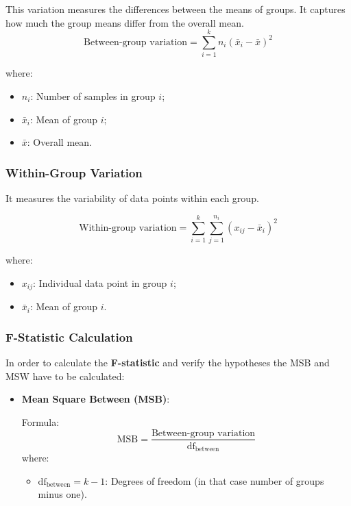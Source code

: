 This variation measures the differences between the means of groups. It
captures how much the group means differ from the overall mean.
\[
\text{Between-group \  variation} = \sum_{i=1}^{k} n_i (\bar{x}_i - \bar{x})^2
\]

\noindent \noindent where:
\begin{itemize}
    \item \(n_i\): Number of samples in group \(i\);
    \item \(\bar{x}_i\): Mean of group \(i\);
    \item \(\bar{x}\): Overall mean.
\end{itemize}


\subsubsection*{Within-Group Variation}
It measures the variability of data points within each group.

\[
\text{Within-group  \ variation} = \sum_{i=1}^{k} \sum_{j=1}^{n_i} (x_{ij} - \bar{x}_i)^2
\]

\noindent \noindent where:
\begin{itemize}
    \item \(x_{ij}\): Individual data point in group \(i\);
    \item \(\bar{x}_i\): Mean of group \(i\).
\end{itemize}



\subsubsection*{F-Statistic Calculation}
In order to calculate the \textbf{F-statistic} and verify the hypotheses
the MSB and MSW have to be calculated:

\begin{itemize}
    \item \textbf{Mean Square Between (MSB)}:
    
    Formula:
    \[
    \text{MSB} = \frac{\text{Between-group variation}}{\text{df}_{\text{between}}}
    \]
    \noindent \noindent where:
    \begin{itemize}
        \item \( \text{df}_{\text{between}} = k - 1 \): Degrees of freedom (in
          that case number of groups minus one).
    \end{itemize}
\end{itemize}

